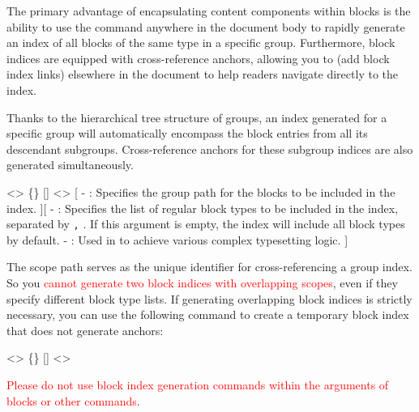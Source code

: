 
The primary advantage of encapsulating content components within blocks is the ability to use the  command anywhere in the document body to rapidly generate an index of all blocks of the same type in a specific group. Furthermore, block indices are equipped with cross-reference anchors, allowing you to (add block index links) elsewhere in the document to help readers navigate directly to the index.

Thanks to the hierarchical tree structure of groups, an index generated for a specific group will automatically encompass the block entries from all its descendant subgroups. Cross-reference anchors for these subgroup indices are also generated simultaneously.

<>{
    \{\}
    []
    <>
}[
    -  : Specifies the group path for the blocks to be included in the index.
][
    -  : Specifies the list of regular block types to be included in the index, separated by \texttt{,} . If this argument is empty, the index will include all block types by default.
    -  : Used in  to achieve various complex typesetting logic.
]

The scope path serves as the unique identifier for cross-referencing a group index. So you \textcolor{red}{cannot generate two block indices with overlapping scopes}, even if they specify different block type lists. If generating overlapping block indices is strictly necessary, you can use the following command to create a temporary block index that does not generate anchors:

<>{
    \{\}
    []
    <>
}

\textcolor{red}{Please do not use block index generation commands within the arguments of blocks or other commands}.

\newpage
